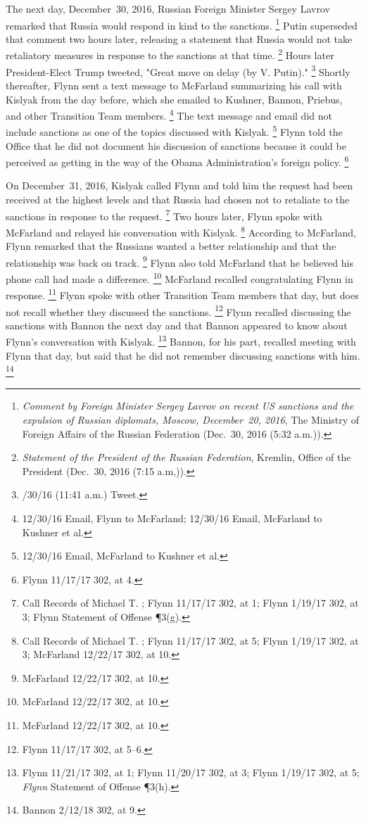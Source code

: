 The next day, December~30, 2016, Russian Foreign Minister Sergey Lavrov remarked that Russia would respond in kind to the sanctions.%
\footnote{\textit{Comment by Foreign Minister Sergey Lavrov on recent US sanctions and the expulsion of Russian diplomats, Moscow, December~20, 2016}, The Ministry of Foreign Affairs of the Russian Federation (Dec.~30, 2016 (5:32 a.m.)).}
Putin superseded that comment two hours later, releasing a statement that Russia would not take retaliatory measures in response to the sanctions at that time.%
\footnote{\textit{Statement of the President of the Russian Federation}, Kremlin, Office of the President (Dec.~30, 2016 (7:15 a.m,)).}
Hours later President-Elect Trump tweeted, "Great move on delay (by V. Putin)."%
\footnote{/30/16 (11:41 a.m.) Tweet.}
Shortly thereafter, Flynn sent a text message to McFarland summarizing his call with Kislyak from the day before, which she emailed to Kushner, Bannon, Priebus, and other Transition Team members.%
\footnote{12/30/16 Email, Flynn to McFarland;
12/30/16 Email, McFarland to Kushner et al.}
The text message and email did not include sanctions as one of the topics discussed with Kislyak.%
\footnote{12/30/16 Email, McFarland to Kushner et al.}
Flynn told the Office that he did not document his discussion of sanctions because it could be perceived as getting in the way of the Obama Administration's foreign policy.%
\footnote{Flynn 11/17/17 302, at 4.}

On December~31, 2016, Kislyak called Flynn and told him the request had been received at the highest levels and that Russia had chosen not to retaliate to the sanctions in response to the request.%
\footnote{Call Records of Michael T. ;
Flynn 11/17/17 302, at 1;
Flynn 1/19/17 302, at 3;
Flynn Statement of Offense \P 3(g).}
Two hours later, Flynn spoke with McFarland and relayed his conversation with Kislyak.%
\footnote{Call Records of Michael T. ;
Flynn 11/17/17 302, at 5;
Flynn 1/19/17 302, at 3;
McFarland 12/22/17 302, at 10.}
According to McFarland, Flynn remarked that the Russians wanted a better relationship and that the relationship was back on track.%
\footnote{McFarland 12/22/17 302, at 10.}
Flynn also told McFarland that he believed his phone call had made a difference.%
\footnote{McFarland 12/22/17 302, at 10.}
McFarland recalled congratulating Flynn in response.%
\footnote{McFarland 12/22/17 302, at 10.}
Flynn spoke with other Transition Team members that day, but does not recall whether they discussed the sanctions.%
\footnote{Flynn 11/17/17 302, at 5--6.}
Flynn recalled discussing the sanctions with Bannon the next day and that Bannon appeared to know about Flynn's conversation with Kislyak.%
\footnote{Flynn 11/21/17 302, at 1;
Flynn 11/20/17 302, at 3;
Flynn 1/19/17 302, at 5;
\textit{Flynn} Statement of Offense \P 3(h).}
Bannon, for his part, recalled meeting with Flynn that day, but said that he did not remember discussing sanctions with him.%
\footnote{Bannon 2/12/18 302, at 9.}

